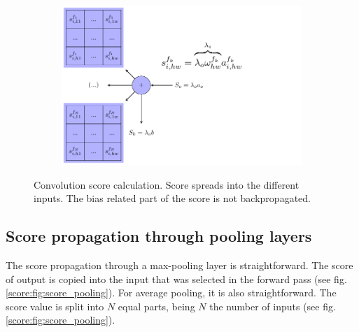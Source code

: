 \begin{figure}[!ht]
\begin{subfigure}{0.4\textwidth}
		\includegraphics[scale=0.5]{Figures/chapter_interpretation/figures/score_conv2d_score.pdf}
	\end{subfigure}
	\caption[Convolution score calculation]{Convolution score calculation. Score spreads into the different inputs. The bias related part of the score is not backpropagated.}
	\label{score:fig:convolution_score}
\end{figure}


\subsection{Score propagation through pooling layers}

The score propagation through a max-pooling layer is straightforward. The score of output is copied into the input that was selected in the forward pass (see fig. \ref{score:fig:score_pooling}). For average pooling, it is also straightforward. The score value is split into $N$ equal parts, being $N$ the number of inputs (see fig. \ref{score:fig:score_pooling}).

